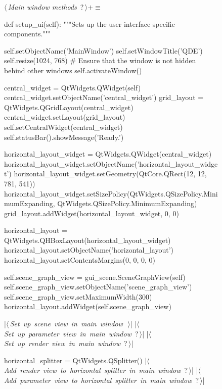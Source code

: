 \documentclass[%
    a4paper,    %
    justified,  %
    nobib,      %
    openany     %
]{tufte-book}
\makeatletter
\renewcommand{\label}[1]{\@tufte@label{##1}}%
\makeatother
\begin{document}
\begin{figure}
\begin{flushleft} \small
\begin{minipage}{\linewidth}\label{scrap20}\raggedright\small
{} $\langle\,${\itshape Main window methods}\nobreak\ {\footnotesize {?}}$\,\rangle+\equiv$
\vspace{-1ex}
\begin{pythoncode}
def setup_ui(self):
    """Sets up the user interface specific components."""

    self.setObjectName('MainWindow')
    self.setWindowTitle('QDE')
    self.resize(1024, 768)
    # Ensure that the window is not hidden behind other windows
    self.activateWindow()

    central_widget = QtWidgets.QWidget(self)
    central_widget.setObjectName('central_widget')
    grid_layout = QtWidgets.QGridLayout(central_widget)
    central_widget.setLayout(grid_layout)
    self.setCentralWidget(central_widget)
    self.statusBar().showMessage('Ready.')

    horizontal_layout_widget = QtWidgets.QWidget(central_widget)
    horizontal_layout_widget.setObjectName('horizontal_layout_widget')
    horizontal_layout_widget.setGeometry(QtCore.QRect(12, 12, 781, 541))
    horizontal_layout_widget.setSizePolicy(QtWidgets.QSizePolicy.MinimumExpanding,
    QtWidgets.QSizePolicy.MinimumExpanding)
    grid_layout.addWidget(horizontal_layout_widget, 0, 0)

    horizontal_layout = QtWidgets.QHBoxLayout(horizontal_layout_widget)
    horizontal_layout.setObjectName('horizontal_layout')
    horizontal_layout.setContentsMargins(0, 0, 0, 0)

    self.scene_graph_view = gui_scene.SceneGraphView(self)
    self.scene_graph_view.setObjectName('scene_graph_view')
    self.scene_graph_view.setMaximumWidth(300)
    horizontal_layout.addWidget(self.scene_graph_view)

    |\hbox{$\langle\,${\itshape Set up scene view in main window}\nobreak\ {\footnotesize {}}$\,\rangle$}|
    |\hbox{$\langle\,${\itshape Set up parameter view in main window}\nobreak\ {\footnotesize ?}$\,\rangle$}|
    |\hbox{$\langle\,${\itshape Set up render view in main window}\nobreak\ {\footnotesize ?}$\,\rangle$}|

    horizontal_splitter = QtWidgets.QSplitter()
    |\hbox{$\langle\,${\itshape Add render view to horizontal splitter in main window}\nobreak\ {\footnotesize ?}$\,\rangle$}|
    |\hbox{$\langle\,${\itshape Add parameter view to horizontal splitter in main window}\nobreak\ {\footnotesize ?}$\,\rangle$}|


\end{pythoncode}
\end{minipage}
\end{flushleft}
\end{figure}
\end{document}
